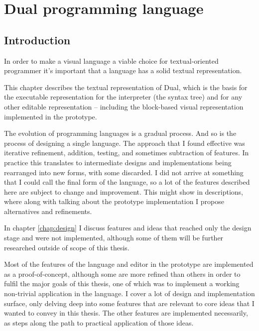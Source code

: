 \chapter{Dual programming language}\label{chap:lang}

\section{Introduction}
In order to make a visual language a viable choice for textual-oriented
programmer it's important that a language has a solid textual representation.

This chapter describes the textual representation of Dual, which is the basis
for the executable representation for the interpreter (the syntax tree) and for
any other editable representation -- including the block-based visual
representation implemented in the prototype.




The evolution of programming languages is a gradual process. And so is the
process of designing a single language. The approach that I found effective was
iterative refinement, addition, testing, and sometimes subtraction of
features. In practice this translates to intermediate designs and
implementations being rearranged into new forms, with some discarded. I did not
arrive at something that I could call the final form of the language, so a lot
of the features described here are subject to change and improvement. This might
show in descriptions, where along with talking about the prototype
implementation I propose alternatives and refinements.

In chapter \ref{chap:design} I discuss features and ideas that reached only the
design stage and were not implemented, although some of them will be further
researched outside of scope of this thesis.

Most of the features of the language and editor in the prototype are implemented
as a proof-of-concept, although some are more refined than others in order to
fulfil the major goals of this thesis, one of which was to implement a working
non-trivial application in the language. I cover a lot of design and
implementation surface, only delving deep into some features that are relevant
to core ideas that I wanted to convey in this thesis. The other features are
implemented necessarily, as steps along the path to practical application of
those ideas.

